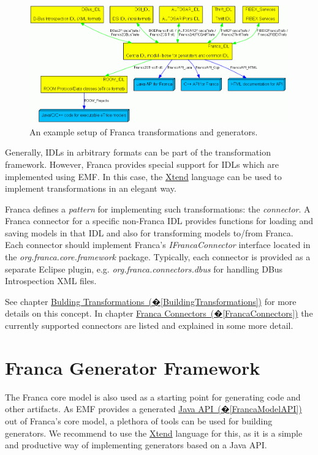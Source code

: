 \documentclass[a4paper,10pt]{scrreprt}
\begin{document}
\begin{figure}[!ht]
\centering
\includegraphics[width=\textwidth]{images/franca_architecture.png}
\caption{An example setup of Franca transformations and generators.}
\label{FrancaExampleNetwork}
\end{figure}

Generally, IDLs in arbitrary formats can be part of the transformation framework.
However, Franca provides special support for IDLs which are implemented using EMF.
In this case, the \href{http://www.xtend-lang.org}{Xtend} language can be used to
implement transformations in an elegant way.

Franca defines a \textit{pattern} for implementing such transformations: the \textit{connector}.
A Franca connector for a specific non-Franca IDL provides functions for loading
and saving models in that IDL and also for transforming models to/from Franca.
Each connector should implement Franca's \textit{IFrancaConnector} interface located in the
\textit{org.franca.core.framework} package. Typically, each connector is provided as a
separate Eclipse plugin, e.g. \textit{org.franca.connectors.dbus} for handling 
DBus Introspection XML files. 

See chapter \hyperref[BuildingTransformations]{Bulding Transformations~(�\ref*{BuildingTransformations})} for more details 
on this concept. In chapter \hyperref[FrancaConnectors]{Franca Connectors~(�\ref*{FrancaConnectors})} the currently
supported connectors are listed and explained in some more detail.

\section{Franca Generator Framework}
\label{FrancaConcepts_IDL_Generators}
The Franca core model is also used as a starting point for generating code and
other artifacts. As EMF provides a generated \hyperref[FrancaModelAPI]{Java API~(�\ref*{FrancaModelAPI})}
out of Franca's core model, a plethora of tools can be used for building
generators. We recommend to use the \href{http://www.xtend-lang.org}{Xtend}
language for this, as it is a simple and productive way of implementing
generators based on a Java API.
\end{document}
